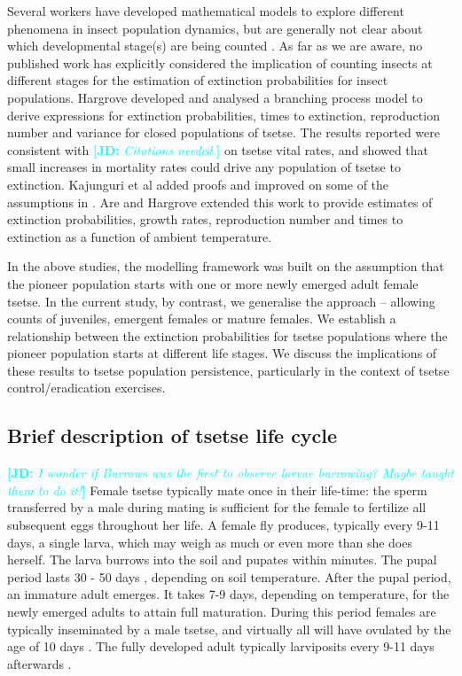 \documentclass[smallextended]{svjour3}
\newcommand{\comment}[3]{\textcolor{#1}{\textbf{[#2: }\textit{#3}\textbf{]}}}
\newcommand{\jd}[1]{\comment{cyan}{JD}{#1}}
\begin{document}
Several workers have developed mathematical models to explore different phenomena in insect population dynamics, but are generally not clear about which developmental stage(s) are being counted \cite{Ylioja1999,Artzrouni2003,Hargrove2005a,Adams2005,Barclay2011d,Peck2012a,Lin2015,Kajunguri2019}.  As far as we are aware, no published work has explicitly considered the implication of counting insects at different stages for the estimation of extinction probabilities for insect populations. Hargrove \cite{Hargrove2005a} developed and analysed a branching process model to derive expressions for extinction probabilities, times to extinction, reproduction number and variance for closed populations of tsetse. The results reported were consistent with \jd{Citations needed.} on tsetse vital rates, and showed that small increases in mortality rates could drive any population of tsetse to extinction. Kajunguri et al \cite{Kajunguri2019} added proofs and improved on some of the assumptions in \cite{Hargrove2005a}. Are and Hargrove \cite{Are2019} extended this work to provide estimates of extinction probabilities, growth rates, reproduction number and times to extinction as a function of ambient temperature. 

In the above studies, the modelling framework was built on the assumption that the pioneer population starts with one or more newly emerged adult female tsetse. In the current study, by contrast, we  generalise the approach – allowing counts of juveniles, emergent females or mature females. We establish a relationship between the extinction probabilities for tsetse populations where the pioneer population starts at different life stages. We discuss the implications of these results to tsetse population persistence, particularly in the context of tsetse control/eradication exercises. 

\subsection{Brief description of tsetse life cycle}

\jd{I wonder if Burrows was the first to observe larvae burrowing? Maybe taught them to do it!}
Female tsetse typically mate once in their life-time: the sperm transferred by a male during mating is sufficient for the female to fertilize all subsequent eggs throughout her life. A female fly produces, typically every 9-11 days, a single larva, which may weigh as much or even more than she does herself.  The larva burrows into the soil and pupates within minutes. The pupal period lasts 30 - 50 days \cite{PhelpsR.J.&Burrows}, depending on soil temperature. After the pupal period, an immature adult emerges. It takes 7-9 days, depending on temperature, for the newly emerged adults to attain full maturation. During this period females are typically inseminated by a male tsetse, and virtually all will have ovulated by the age of 10 days \cite{Hargrove2012c}. The fully developed adult typically larviposits every 9-11 days afterwards \cite{Hargrove2019}. 
\end{document}
